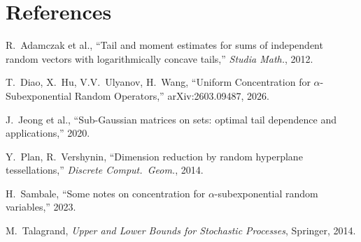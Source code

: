 \documentclass[11pt,a4paper]{article}
\begin{document}
\section*{References}

\begin{enumerate}[label={[\arabic*]},leftmargin=*]
  \item R.\ Adamczak et al., ``Tail and moment estimates for sums of independent random vectors with logarithmically concave tails,'' \textit{Studia Math.}, 2012.
  \item T.\ Diao, X.\ Hu, V.V.\ Ulyanov, H.\ Wang, ``Uniform Concentration for $\alpha$-Subexponential Random Operators,'' arXiv:2603.09487, 2026.
  \item J.\ Jeong et al., ``Sub-Gaussian matrices on sets: optimal tail dependence and applications,'' 2020.
  \item Y.\ Plan, R.\ Vershynin, ``Dimension reduction by random hyperplane tessellations,'' \textit{Discrete Comput.\ Geom.}, 2014.
  \item H.\ Sambale, ``Some notes on concentration for $\alpha$-subexponential random variables,'' 2023.
  \item M.\ Talagrand, \textit{Upper and Lower Bounds for Stochastic Processes}, Springer, 2014.
\end{enumerate}
\end{document}
